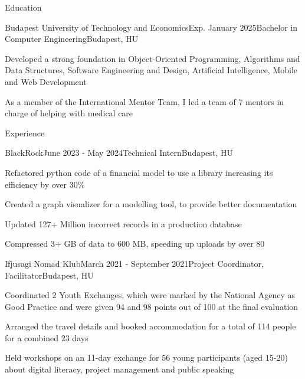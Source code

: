 \documentclass[
	a4paper, %
	11pt, %
]{resume} %
\begin{document}

\begin{rSection}{Education}

	\begin{rSubsection}{Budapest University of Technology and Economics}{Exp. January 2025}{Bachelor in Computer Engineering}{Budapest, HU}
		\item Developed a strong foundation in Object-Oriented Programming, Algorithms and Data Structures, Software Engineering and Design, Artificial Intelligence, Mobile and Web Development
		\item As a member of the International Mentor Team, I led a team of 7 mentors in charge of helping with medical care
	\end{rSubsection}

\end{rSection}


\begin{rSection}{Experience}

	\begin{rSubsection}{BlackRock}{June 2023 - May 2024}{Technical Intern}{Budapest, HU}
		\item Refactored python code of a financial model to use a library increasing its efficiency by over 30\%
		\item Created a graph visualizer for a modelling tool, to provide better documentation
		\item Updated 127+ Million incorrect records in a production database
		\item Compressed 3+ GB of data to 600 MB, speeding up uploads by over 80%
	\end{rSubsection}

	\begin{rSubsection}{Ifjusagi Nomad Klub}{March 2021 - September 2021}{Project Coordinator, Facilitator}{Budapest, HU}
		\item Coordinated 2 Youth Exchanges, which were marked by the National Agency as Good Practice and were given 94 and 98 points out of 100 at the final evaluation
		\item Arranged the travel details and booked accommodation for a total of 114 people for a combined 23 days
		\item Held workshops on an 11-day exchange for 56 young participants (aged 15-20) about digital literacy, project management and public speaking
	\end{rSubsection}

\end{rSection}
\end{document}
